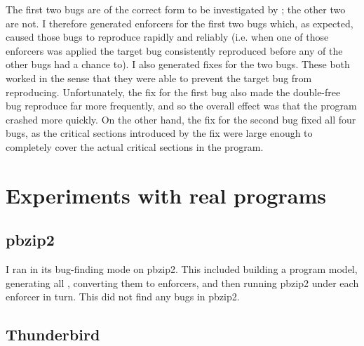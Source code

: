 
The first two bugs are of the correct form to be investigated by
{\technique}; the other two are not.  I therefore generated enforcers
for the first two bugs which, as expected, caused those bugs to
reproduce rapidly and reliably (i.e. when one of those enforcers was
applied the target bug consistently reproduced before any of the other
bugs had a chance to).  I also generated fixes for the two bugs.
These both worked in the sense that they were able to prevent the
target bug from reproducing.  Unfortunately, the fix for the first bug
also made the double-free bug reproduce far more frequently, and so
the overall effect was that the program crashed more quickly.  On the
other hand, the fix for the second bug fixed all four bugs, as the
critical sections introduced by the fix were large enough to
completely cover the actual critical sections in the program.



\section{Experiments with real programs}
\label{sect:eval:real}

\subsection{pbzip2}

I ran {\implementation} in its bug-finding mode on pbzip2.  This
included building a program model, generating all {\StateMachines},
converting them to enforcers, and then running pbzip2 under each
enforcer in turn.  This did not find any bugs in pbzip2.


\subsection{Thunderbird}

